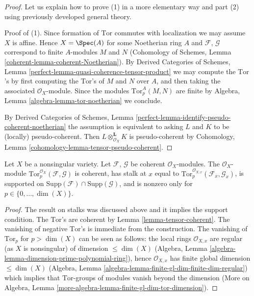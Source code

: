 \begin{proof}
Let us explain how to prove (1) in a more elementary way and part (2)
using previously developed general theory.

\medskip\noindent
Proof of (1). Since formation of $\text{Tor}$ commutes with localization
we may assume $X$ is affine. Hence $X = \Spec(A)$ for some Noetherian
ring $A$ and $\mathcal{F}$, $\mathcal{G}$ correspond to finite $A$-modules
$M$ and $N$ (Cohomology of Schemes, Lemma
\ref{coherent-lemma-coherent-Noetherian}).
By Derived Categories of Schemes, Lemma
\ref{perfect-lemma-quasi-coherence-tensor-product} we may
compute the $\text{Tor}$'s by first computing the $\text{Tor}$'s
of $M$ and $N$ over $A$, and then taking the associated $\mathcal{O}_X$-module.
Since the modules $\text{Tor}_p^A(M, N)$ are finite by
Algebra, Lemma \ref{algebra-lemma-tor-noetherian}
we conclude.

\medskip\noindent
By Derived Categories of Schemes, Lemma
\ref{perfect-lemma-identify-pseudo-coherent-noetherian}
the assumption is equivalent to asking $L$ and $K$ to be
(locally) pseudo-coherent. Then $L \otimes_{\mathcal{O}_X}^\mathbf{L} K$
is pseudo-coherent by
Cohomology, Lemma \ref{cohomology-lemma-tensor-pseudo-coherent}.
\end{proof}

\begin{lemma}
\label{lemma-compute-tor-nonsingular}
Let $X$ be a nonsingular variety.
Let $\mathcal{F}$, $\mathcal{G}$ be coherent $\mathcal{O}_X$-modules.
The $\mathcal{O}_X$-module
$\text{Tor}_p^{\mathcal{O}_X}(\mathcal{F}, \mathcal{G})$
is coherent, has stalk at $x$ equal to
$\text{Tor}_p^{\mathcal{O}_{X, x}}(\mathcal{F}_x, \mathcal{G}_x)$,
is supported on
$\text{Supp}(\mathcal{F}) \cap \text{Supp}(\mathcal{G})$, and
is nonzero only for $p \in \{0, \ldots, \dim(X)\}$.
\end{lemma}

\begin{proof}
The result on stalks was discussed above and it implies the support
condition. The $\text{Tor}$'s are coherent by
Lemma \ref{lemma-tensor-coherent}. The vanishing of negative
$\text{Tor}$'s is immediate from the construction. The
vanishing of $\text{Tor}_p$ for $p > \dim(X)$ can be seen as follows:
the local rings $\mathcal{O}_{X, x}$ are regular
(as $X$ is nonsingular) of dimension $\leq \dim(X)$
(Algebra, Lemma \ref{algebra-lemma-dimension-prime-polynomial-ring}),
hence $\mathcal{O}_{X, x}$ has finite global dimension $\leq \dim(X)$
(Algebra, Lemma \ref{algebra-lemma-finite-gl-dim-finite-dim-regular})
which implies that $\text{Tor}$-groups of modules vanish beyond the dimension
(More on Algebra, Lemma \ref{more-algebra-lemma-finite-gl-dim-tor-dimension}).
\end{proof}

